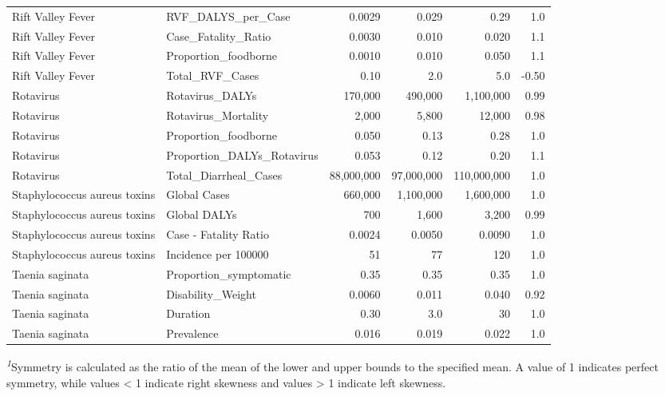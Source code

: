 \documentclass[
  letterpaper,
  DIV=11,
  numbers=noendperiod]{scrartcl}
\begin{document}
\begin{table}
{\begin{tabular*}{\linewidth}{@{\extracolsep{\fill}}llrrrr}
Rift Valley Fever & RVF\_DALYS\_per\_Case & 0.0029 & 0.029 & 0.29 & 1.0 \\ 
Rift Valley Fever & Case\_Fatality\_Ratio & 0.0030 & 0.010 & 0.020 & 1.1 \\ 
Rift Valley Fever & Proportion\_foodborne & 0.0010 & 0.010 & 0.050 & 1.1 \\ 
Rift Valley Fever & Total\_RVF\_Cases & 0.10 & 2.0 & 5.0 & -0.50 \\ 
Rotavirus & Rotavirus\_DALYs & 170,000 & 490,000 & 1,100,000 & 0.99 \\ 
Rotavirus & Rotavirus\_Mortality & 2,000 & 5,800 & 12,000 & 0.98 \\ 
Rotavirus & Proportion\_foodborne & 0.050 & 0.13 & 0.28 & 1.0 \\ 
Rotavirus & Proportion\_DALYs\_Rotavirus & 0.053 & 0.12 & 0.20 & 1.1 \\ 
Rotavirus & Total\_Diarrheal\_Cases & 88,000,000 & 97,000,000 & 110,000,000 & 1.0 \\ 
Staphylococcus aureus toxins & Global Cases & 660,000 & 1,100,000 & 1,600,000 & 1.0 \\ 
Staphylococcus aureus toxins & Global DALYs & 700 & 1,600 & 3,200 & 0.99 \\ 
Staphylococcus aureus toxins & Case - Fatality Ratio & 0.0024 & 0.0050 & 0.0090 & 1.0 \\ 
Staphylococcus aureus toxins & Incidence per 100000 & 51 & 77 & 120 & 1.0 \\ 
Taenia saginata & Proportion\_symptomatic & 0.35 & 0.35 & 0.35 & 1.0 \\ 
Taenia saginata & Disability\_Weight & 0.0060 & 0.011 & 0.040 & 0.92 \\ 
Taenia saginata & Duration & 0.30 & 3.0 & 30 & 1.0 \\ 
Taenia saginata & Prevalence & 0.016 & 0.019 & 0.022 & 1.0 \\ 
\bottomrule
\end{tabular*}
\begin{minipage}{\linewidth}
\textsuperscript{\textit{1}}Symmetry is calculated as the ratio of the mean of the lower and upper bounds to the specified mean. A value of 1 indicates perfect symmetry, while values < 1 indicate right skewness and values > 1 indicate left skewness.\\
\end{minipage}

}

\end{table}%
\end{document}
